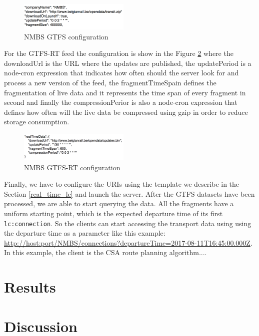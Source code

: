 \documentclass[sw]{iosart2x}
\begin{document}
\begin{figure}[t]
	\includegraphics[width=0.47\textwidth]{images/nmbs_server.png}
	\caption{NMBS GTFS configuration}\label{fig:nmbs_server}
\end{figure}

For the GTFS-RT feed the configuration is show in the Figure \ref{fig:nmbs_rt_server} where the downloadUrl is the URL where the updates are published, the updatePeriod is a node-cron expression that indicates  how often should the server look for and process a new version of the feed, the fragmentTimeSpain defines the fragmentation of live data and it represents the time span of every fragment in second and finally the compressionPerior is also a node-cron expression that defines how often will the live data be compressed using gzip in order to reduce storage consumption.

\begin{figure}[t]
	\includegraphics[width=0.47\textwidth]{images/nmbs_rt_server.png}
	\caption{NMBS GTFS-RT configuration}\label{fig:nmbs_rt_server}
\end{figure}

Finally, we have to configure the URIs using the template we describe in the Section \ref{real_time_lc} and launch the server. After the GTFS datasets have been processed, we are able to start querying the data. All the fragments have a uniform starting point, which is the expected departure time of its first \texttt{lc:connection}. So the clients can start accessing the transport data using using the departure time as a parameter like this example: \url{http://host:port/NMBS/connections?departureTime=2017-08-11T16:45:00.000Z}. In this example, the client is the CSA route planning algorithm....%


\section{Results} %




\section{Discussion} %
\end{document}
